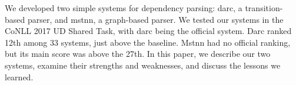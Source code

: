 We developed two simple systems for dependency parsing: darc, a transition-based parser, and mstnn, a graph-based parser. We tested our systems in the CoNLL 2017 UD Shared Task, with darc being the official system. Darc ranked 12th among 33 systems, just above the baseline. Mstnn had no official ranking, but its main score was above the 27th. In this paper, we describe our two systems, examine their strengths and weaknesses, and discuss the lessons we learned.

